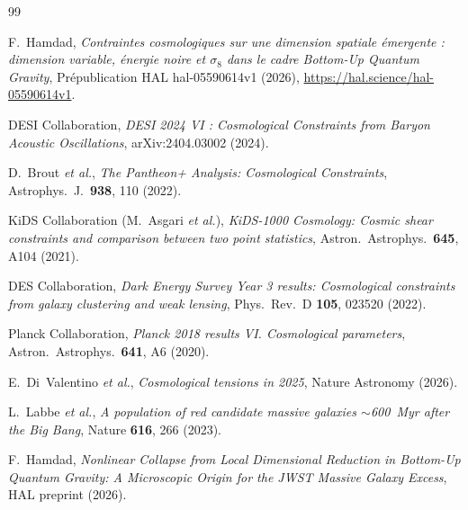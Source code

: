 \documentclass[11pt]{article}
\begin{document}

\begin{thebibliography}{99}

F.~Hamdad,
\textit{Contraintes cosmologiques sur une dimension spatiale émergente :
dimension variable, énergie noire et $\sigma_8$ dans le cadre
Bottom-Up Quantum Gravity},
Prépublication HAL hal-05590614v1 (2026),
\url{https://hal.science/hal-05590614v1}.

DESI Collaboration,
\textit{DESI 2024 VI : Cosmological Constraints from Baryon Acoustic
Oscillations},
arXiv:2404.03002 (2024).

D.~Brout \textit{et al.},
\textit{The Pantheon+ Analysis: Cosmological Constraints},
Astrophys.\ J.\ \textbf{938}, 110 (2022).

KiDS Collaboration (M.~Asgari \textit{et al.}),
\textit{KiDS-1000 Cosmology: Cosmic shear constraints and comparison
between two point statistics},
Astron.\ Astrophys.\ \textbf{645}, A104 (2021).

DES Collaboration,
\textit{Dark Energy Survey Year 3 results: Cosmological constraints
from galaxy clustering and weak lensing},
Phys.\ Rev.\ D \textbf{105}, 023520 (2022).

Planck Collaboration,
\textit{Planck 2018 results VI. Cosmological parameters},
Astron.\ Astrophys.\ \textbf{641}, A6 (2020).

E.~Di~Valentino \textit{et al.},
\textit{Cosmological tensions in 2025},
Nature Astronomy (2026).

L.~Labbe \textit{et al.},
\textit{A population of red candidate massive galaxies $\sim$600~Myr
after the Big Bang},
Nature \textbf{616}, 266 (2023).

F.~Hamdad,
\textit{Nonlinear Collapse from Local Dimensional Reduction in
Bottom-Up Quantum Gravity: A Microscopic Origin for the JWST
Massive Galaxy Excess},
HAL preprint (2026).

\end{thebibliography}
\end{document}
